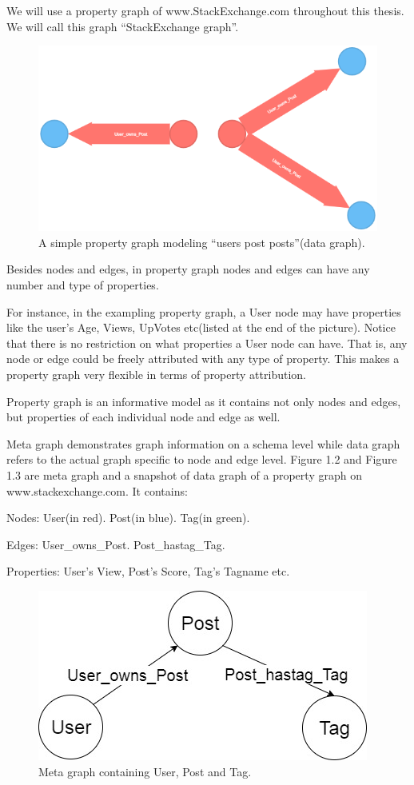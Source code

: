 We will use a property graph of www.StackExchange.com throughout this thesis. We will call this graph ``StackExchange graph''. 


\begin {figure}[H]
\centering
\includegraphics[scale=0.4]{pic/11.png}
\caption{A simple property graph modeling ``users post posts''(data graph).}
\end{figure}


Besides nodes and edges, in property graph nodes and edges can have any number and type of properties. 


For instance, in the exampling property graph, a User node may have properties like the user’s Age, Views, UpVotes etc(listed at the end of the picture). Notice that there is no restriction on what properties a User node can have.  That is, any node or edge could be freely attributed with any type of property. This makes a property graph very flexible in terms of property attribution.
 
Property graph is an informative model as it contains not only nodes and edges, but properties of each individual node and edge as well. 

Meta graph demonstrates graph information on a schema level while data graph refers to the actual graph specific to node and edge level. Figure 1.2 and Figure 1.3 are meta graph and a snapshot of data graph of a property graph on www.stackexchange.com. It contains:

Nodes:	User(in red).
Post(in blue). 
Tag(in green). 
 
Edges: 		User\_owns\_Post. 
Post\_hastag\_Tag.
 
Properties:	User’s View, Post’s Score, Tag’s Tagname etc.

\begin {figure}[H]
\centering
\includegraphics[scale=0.5]{pic/12.jpg}
\caption{Meta graph containing User, Post and Tag.}
\end{figure}
 
